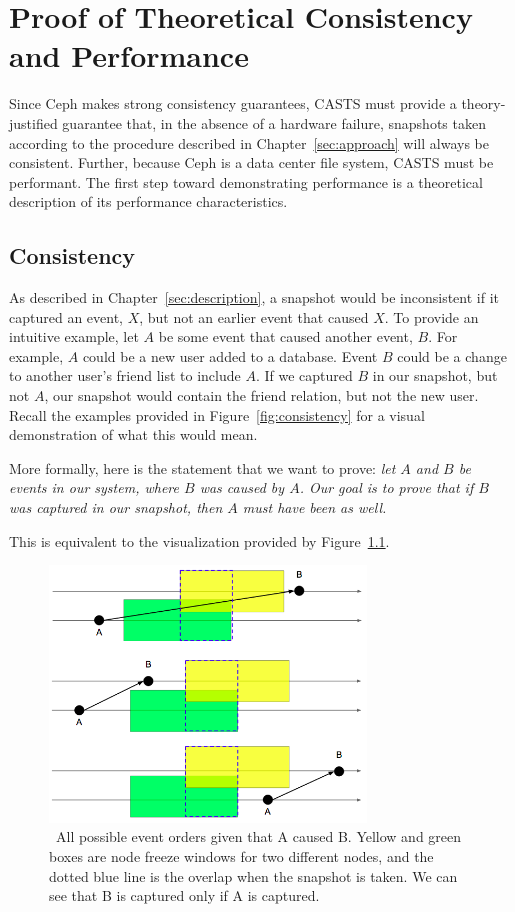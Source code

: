 \chapter{Proof of Theoretical Consistency and Performance}
\label{sec:proof}

Since Ceph makes strong consistency guarantees, CASTS must provide a
theory-justified guarantee that, in the absence of a hardware failure,
snapshots taken according to the procedure described in
Chapter~\ref{sec:approach} will always be consistent. Further, because
Ceph is a data center file system, CASTS must be performant. The first
step toward demonstrating performance is a theoretical description of
its performance characteristics.

\section{Consistency}

As described in Chapter~\ref{sec:description}, a snapshot would be
inconsistent if it captured an event, $X$, but not an earlier event that
caused $X$. To provide an intuitive example, let $A$ be some event that
caused another event, $B$.  For example, $A$ could be a new user added
to a database. Event $B$ could be a change to another user's friend
list to include $A$. If we captured $B$ in our snapshot, but not $A$,
our snapshot would contain the friend relation, but not the new
user. Recall the examples provided in Figure~\ref{fig:consistency} for
a visual demonstration of what this would mean.

More formally, here is the statement that we want to prove: {\em let
  $A$ and $B$ be events in our system, where $B$ was caused by
  $A$. Our goal is to prove that if $B$ was captured in our snapshot,
  then $A$ must have been as well.}

This is equivalent to the visualization provided by
Figure~\ref{fig:consistentoverlap}.

\begin{figure}[!htbp]
  \centering
  \caption{~All possible event orders given that A caused B. Yellow and green boxes are node freeze windows for two different nodes, and the dotted blue line is the overlap when the snapshot is taken. We can see that B is captured only if A is captured.}
  \label{fig:consistentoverlap}
  \includegraphics[width=0.75\textwidth]{consistentoverlap.png}
\end{figure}

